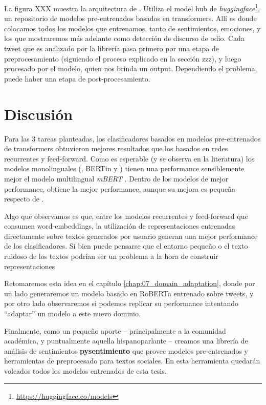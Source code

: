 La figura XXX muestra la arquitectura de \pysentimiento{}. Utiliza el model hub de \emph{huggingface}\footnote{\url{https://huggingface.co/models}}, un repositorio de modelos pre-entrenados basados en transformers. Allí es donde colocamos todos los modelos que entrenamos, tanto de sentimientos, emociones, y los que mostraremos más adelante como detección de discurso de odio. Cada tweet que es analizado por la librería pasa primero por una etapa de preprocesamiento (siguiendo el proceso explicado en la sección zzz), y luego procesado por el modelo, quien nos brinda un output. Dependiendo el problema, puede haber una etapa de post-procesamiento.




%
%
%

\section{Discusión}

Para las 3 tareas planteadas, los clasificadores basados en modelos pre-entrenados de transformers obtuvieron mejores resultados que los basados en redes recurrentes y feed-forward. Como es esperable (y se observa en la literatura) los modelos monolinguales (\roberta{}, BERTin y \beto{}) tienen una performance sensiblemente mejor el modelo multilingual \emph{mBERT} . Dentro de los modelos de mejor performance, \roberta{} obtiene la mejor performance, aunque su mejora es pequeña respecto de \beto{}.

Algo que observamos es que, entre los modelos recurrentes y feed-forward que consumen word-embeddings, la utilización de representaciones entrenadas directamente sobre textos generados por usuario generan una mejor performance de los clasificadores. Si bien puede pensarse que el entorno pequeño o el texto ruidoso de los textos podrían ser un problema a la hora de construir representaciones

Retomaremos esta idea en el capítulo \ref{chap:07_domain_adaptation}, donde por un lado generaremos un modelo basado en RoBERTa entrenado sobre tweets, y por otro lado observaremos si podemos replicar su performance intentando ``adaptar'' un modelo \beto{} a este nuevo dominio.

Finalmente, como un pequeño aporte -- principalmente a la comunidad académica, y puntualmente aquella hispanoparlante -- creamos una librería de análisis de sentimientos \textbf{pysentimiento} que provee modelos pre-entrenados y herramientas de preprocesado para textos sociales. En esta herramienta quedarán volcados todos los modelos entrenados de esta tesis.

